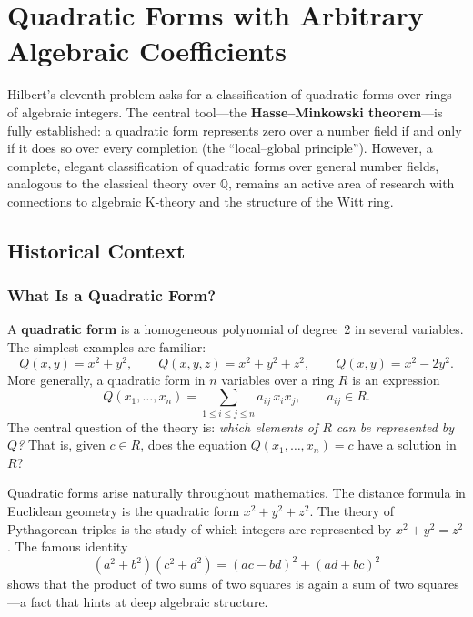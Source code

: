 
\chapter[Quadratic Forms]{Quadratic Forms with Arbitrary Algebraic Coefficients}

\begin{partiallybox}
Hilbert's eleventh problem asks for a classification of quadratic forms over rings of algebraic integers. The central tool---the \textbf{Hasse--Minkowski theorem}---is fully established: a quadratic form represents zero over a number field if and only if it does so over every completion (the ``local--global principle''). However, a complete, elegant classification of quadratic forms over general number fields, analogous to the classical theory over $\mathbb{Q}$, remains an active area of research with connections to algebraic K-theory and the structure of the Witt ring.
\end{partiallybox}

\section{Historical Context}

\subsection{What Is a Quadratic Form?}

A \textbf{quadratic form} is a homogeneous polynomial of degree~2 in several variables. The simplest examples are familiar:
\[
    Q(x, y) = x^2 + y^2, \qquad Q(x, y, z) = x^2 + y^2 + z^2, \qquad Q(x, y) = x^2 - 2y^2.
\]
More generally, a quadratic form in $n$ variables over a ring $R$ is an expression
\[
    Q(x_1, \ldots, x_n) = \sum_{1 \le i \le j \le n} a_{ij}\, x_i x_j, \qquad a_{ij} \in R.
\]
The central question of the theory is: \emph{which elements of $R$ can be represented by $Q$?} That is, given $c \in R$, does the equation $Q(x_1, \ldots, x_n) = c$ have a solution in $R$?

Quadratic forms arise naturally throughout mathematics. The distance formula in Euclidean geometry is the quadratic form $x^2 + y^2 + z^2$. The theory of Pythagorean triples is the study of which integers are represented by $x^2 + y^2 = z^2$. The famous identity
\[
    (a^2 + b^2)(c^2 + d^2) = (ac - bd)^2 + (ad + bc)^2
\]
shows that the product of two sums of two squares is again a sum of two squares---a fact that hints at deep algebraic structure.

